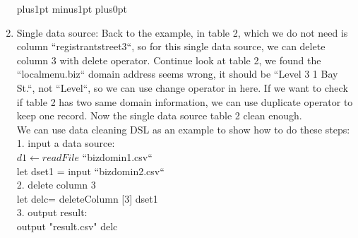 \documentclass[11pt]{article}
\def\denseitems{
    \itemsep1pt plus1pt minus1pt
    \parsep0pt plus0pt
    \parskip0pt\topsep0pt}
\begin{document}
\begin{enumerate}[(1)]\denseitems
 \item  Single data source:
Back to the example, in table 2, which we do not need is  column ``registrantstreet3``, so for this single data source, we can delete column 3 with delete operator. Continue look at table 2, we found the ``localmenu.biz`` domain address seems wrong, it should be ``Level 3 1 Bay St.``, not ``Level``, so we can use change operator in here. If we want to check if table 2 has two same domain information, we can use duplicate operator to keep one record. Now the single data source table 2 clean enough.\\
We can use data cleaning DSL as an example to show how to do these steps:\\
1. input a data source:\\
  $d1\xleftarrow{}  readFile $ ``bizdomin1.csv``\\
  let dset1 = input ``bizdomin2.csv``\\
2. delete column 3\\
 let delc= deleteColumn [3] dset1 \\
3. output result:\\
output "result.csv" delc\\


\end{enumerate}
\end{document}
